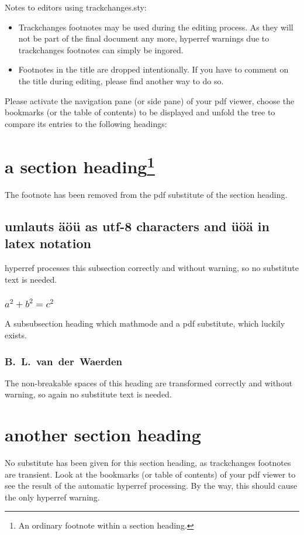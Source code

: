 \documentclass{snapshotmfo}
\begin{document}
\noindent Notes to editors using trackchanges.sty:
\begin{itemize}
  \item Trackchanges footnotes may be used during the editing process. As they will not be part of the final document any more, hyperref warnings due to trackchanges footnotes can simply be ingored.
  \item Footnotes in the title are dropped intentionally. If you have to comment on the title during editing, please find another way to do so.
\end{itemize}

\noindent Please activate the navigation pane (or side pane) of your pdf viewer, choose the bookmarks (or the table of contents) to be displayed and unfold the tree to compare its entries to the following headings:

\section[abbr. section heading]{a section heading\footnote{An ordinary footnote within a section heading.}
}
The footnote has been removed from the pdf substitute of the section heading.

\subsection{umlauts äöü as utf-8 characters and \"u\"o\"a in latex notation}
hyperref processes this subsection correctly and without warning, so no substitute text is needed.

\subsubsection[a²+b²=c²]{$a^2 + b^2 = c^2$}
A subsubsection heading which mathmode and a pdf substitute, which luckily exists.

\subsubsection{B.~L.~van~der~Waerden}
The non-breakable spaces of this heading are transformed correctly and without warning, so again no substitute text is needed.

\section{another section heading}
No substitute has been given for this section heading, as trackchanges footnotes are transient.
Look at the bookmarks (or table of contents) of your pdf viewer to see the result of the automatic hyperref processing.
By the way, this should cause the only hyperref warning.
\end{document}
